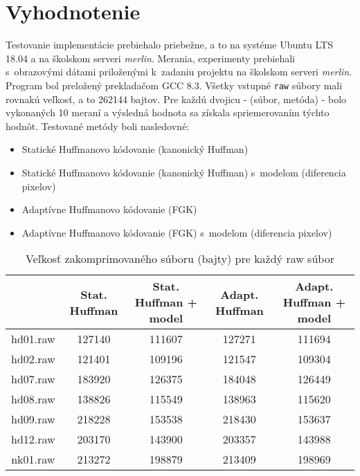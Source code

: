 \documentclass[10pt,a4paper]{article}
\begin{document}
\section{Vyhodnotenie}
Testovanie implementácie prebiehalo priebežne, a to na systéme Ubuntu LTS 18.04 a na školskom serveri \textit{merlin}. Merania, experimenty prebiehali s~obrazovými dátami priloženými k~zadaniu projektu na školskom serveri \textit{merlin}. Program bol preložený prekladačom GCC 8.3. Všetky vstupné \texttt{raw} súbory mali rovnakú veľkosť, a to 262144 bajtov. Pre každú dvojicu \-- (súbor, metóda) \-- bolo vykonaných 10 meraní a výsledná hodnota sa získala spriemerovaním týchto hodnôt. Testované metódy boli nasledovné:
\begin{itemize}
	\item Statické Huffmanovo kódovanie (kanonický Huffman)
	\item Statické Huffmanovo kódovanie (kanonický Huffman) s~modelom (diferencia pixelov)
	\item Adaptívne Huffmanovo kódovanie (FGK)
	\item Adaptívne Huffmanovo kódovanie (FGK) s~modelom (diferencia pixelov)
\end{itemize}

\begin{table}[H]
	\begin{tabular}{|c|c|c|c|c|}
		\hline
		& Stat. Huffman & Stat. Huffman + model & Adapt. Huffman & Adapt. Huffman + model \\
		\hline
		hd01.raw & 127140 & 111607 & 127271 & 111694 \\
		\hline
		hd02.raw & 121401 & 109196 & 121547 & 109304 \\
		\hline
		hd07.raw & 183920 & 126375 & 184048 & 126449 \\
		\hline
		hd08.raw & 138826 & 115549 & 138963 & 115620 \\
		\hline
		hd09.raw & 218228 & 153538 & 218430 & 153637 \\
		\hline
		hd12.raw & 203170 & 143900 & 203357 & 143988 \\
		\hline
		nk01.raw & 213272 & 198879 & 213409 & 198969 \\
		\hline                               
	\end{tabular}
	\caption{Veľkosť zakomprimovaného súboru (bajty) pre každý raw súbor}
\end{table}
\end{document}
